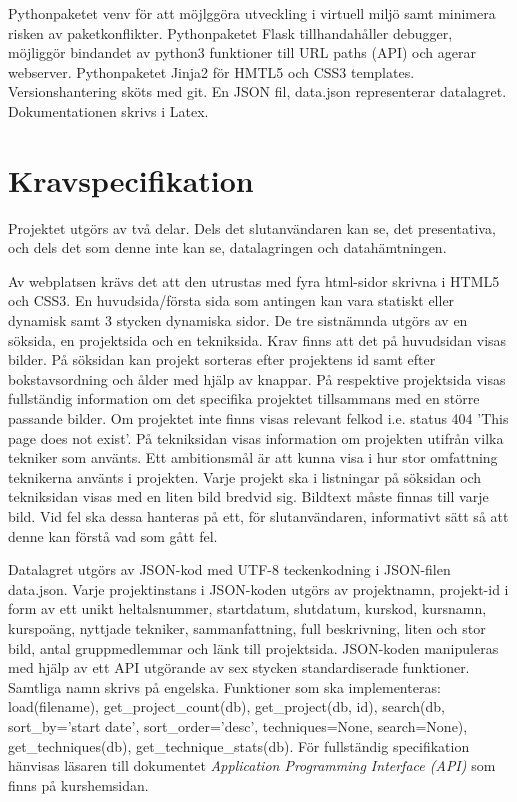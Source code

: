\documentclass{TDP003mall}
\begin{document}
Pythonpaketet venv för att möjlggöra utveckling i virtuell miljö samt minimera risken av paketkonflikter.
Pythonpaketet Flask tillhandahåller debugger, möjliggör bindandet av python3 funktioner till URL paths (API) och agerar webserver.
Pythonpaketet Jinja2 för HMTL5 och CSS3 templates.
Versionshantering sköts med git.
En JSON fil, data.json representerar datalagret.
Dokumentationen skrivs i Latex.

\section{Kravspecifikation}
Projektet utgörs av två delar. Dels det slutanvändaren kan se, det presentativa, och dels det som denne inte kan se, datalagringen och datahämtningen.

Av webplatsen krävs det att den utrustas med fyra html-sidor skrivna i HTML5 och CSS3. En huvudsida/första sida som antingen kan vara statiskt eller dynamisk samt 3 stycken dynamiska sidor. De tre sistnämnda utgörs av en söksida, en projektsida och en tekniksida. Krav finns att det på huvudsidan visas bilder. På söksidan kan projekt sorteras efter projektens id samt efter bokstavsordning och ålder med hjälp av knappar. På respektive projektsida visas fullständig information om det specifika projektet tillsammans med en större passande bilder. Om projektet inte finns visas relevant felkod i.e. status 404 'This page does not exist'. På tekniksidan visas information om projekten utifrån vilka tekniker som använts. Ett ambitionsmål är att kunna visa i hur stor omfattning teknikerna använts i projekten. Varje projekt ska i listningar på söksidan och tekniksidan visas med en liten bild bredvid sig. Bildtext måste finnas till varje bild. Vid fel ska dessa hanteras på ett, för slutanvändaren, informativt sätt så att denne kan förstå vad som gått fel.

Datalagret utgörs av JSON-kod med UTF-8 teckenkodning i JSON-filen data.json. Varje projektinstans i JSON-koden utgörs av projektnamn, projekt-id i form av ett unikt heltalsnummer, startdatum, slutdatum, kurskod, kursnamn, kurspoäng, nyttjade tekniker, sammanfattning, full beskrivning, liten och stor bild, antal gruppmedlemmar och länk till projektsida. JSON-koden manipuleras med hjälp av ett API utgörande av sex stycken standardiserade funktioner. Samtliga namn skrivs på engelska. Funktioner som ska implementeras: load(filename), get\_project\_count(db), get\_project(db, id), search(db, sort\_by='start date', sort\_order='desc', techniques=None, search=None), get\_techniques(db), get\_technique\_stats(db). För fullständig specifikation hänvisas läsaren till dokumentet \textit{Application Programming Interface (API)} som finns på kurshemsidan.
\end{document}
